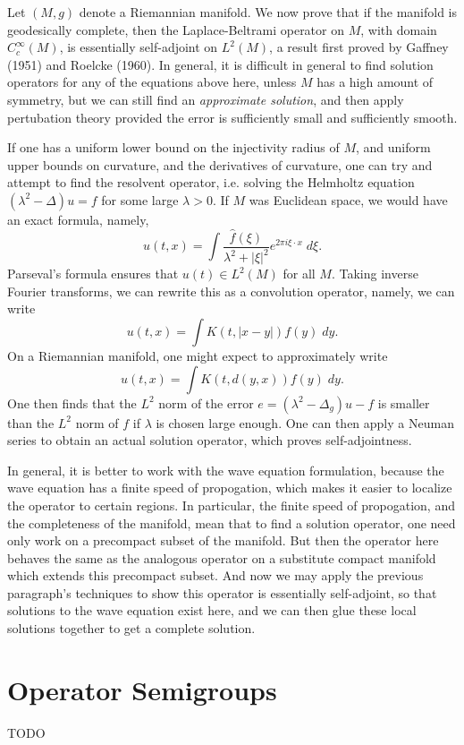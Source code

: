 \begin{example}
    Let $(M,g)$ denote a Riemannian manifold. We now prove that if the manifold is geodesically complete, then the Laplace-Beltrami operator on $M$, with domain $C_c^\infty(M)$, is essentially self-adjoint on $L^2(M)$, a result first proved by Gaffney (1951) and Roelcke (1960). In general, it is difficult in general to find solution operators for any of the equations above here, unless $M$ has a high amount of symmetry, but we can still find an \emph{approximate solution}, and then apply pertubation theory provided the error is sufficiently small and sufficiently smooth.

    If one has a uniform lower bound on the injectivity radius of $M$, and uniform upper bounds on curvature, and the derivatives of curvature, one can try and attempt to find the resolvent operator, i.e. solving the Helmholtz equation $(\lambda^2 - \Delta) u = f$ for some large $\lambda > 0$. If $M$ was Euclidean space, we would have an exact formula, namely,
    \[ u(t,x) = \int \frac{\widehat{f}(\xi)}{\lambda^2 + |\xi|^2} e^{2 \pi i \xi \cdot x}\; d\xi. \]
    Parseval's formula ensures that $u(t) \in L^2(M)$ for all $M$. Taking inverse Fourier transforms, we can rewrite this as a convolution operator, namely, we can write
    \[ u(t,x) = \int K(t,|x-y|) f(y)\; dy. \] 
    On a Riemannian manifold, one might expect to approximately write
    \[ u(t,x) = \int K(t,d(y,x)) f(y)\; dy. \]
    One then finds that the $L^2$ norm of the error $e = (\lambda^2 - \Delta_g) u - f$ is smaller than the $L^2$ norm of $f$ if $\lambda$ is chosen large enough. One can then apply a Neuman series to obtain an actual solution operator, which proves self-adjointness.

    In general, it is better to work with the wave equation formulation, because the wave equation has a finite speed of propogation, which makes it easier to localize the operator to certain regions. In particular, the finite speed of propogation, and the completeness of the manifold, mean that to find a solution operator, one need only work on a precompact subset of the manifold. But then the operator here behaves the same as the analogous operator on a substitute compact manifold which extends this precompact subset. And now we may apply the previous paragraph's techniques to show this operator is essentially self-adjoint, so that solutions to the wave equation exist here, and we can then glue these local solutions together to get a complete solution. 
\end{example}











\section{Operator Semigroups}

TODO


